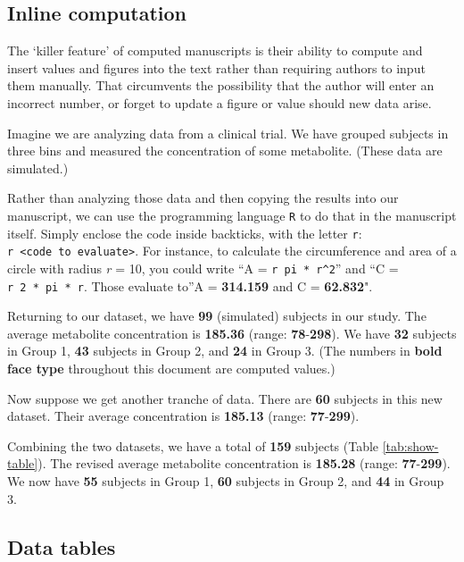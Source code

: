 \documentclass[smallextended]{svjour3}       %
\begin{document}
\hypertarget{sec:1}{%
\subsection{Inline computation}\label{sec:1}}

The `killer feature' of computed manuscripts is their ability to compute and insert values and figures into the text rather than requiring authors to input them manually. That circumvents the possibility that the author will enter an incorrect number, or forget to update a figure or value should new data arise.

Imagine we are analyzing data from a clinical trial. We have grouped subjects in three bins and measured the concentration of some metabolite. (These data are simulated.)

Rather than analyzing those data and then copying the results into our manuscript, we can use the programming language \texttt{R} to do that in the manuscript itself. Simply enclose the code inside backticks, with the letter \texttt{r}: \texttt{\textasciigrave{}r\ \textless{}code\ to\ evaluate\textgreater{}\textasciigrave{}}. For instance, to calculate the circumference and area of a circle with radius \emph{r} = 10, you could write ``A = \texttt{\textasciigrave{}r\ pi\ *\ r\^{}2\textasciigrave{}}'' and ``C = \texttt{\textasciigrave{}r\ 2\ *\ pi\ *\ r\textasciigrave{}}. Those evaluate to''A = \textbf{314.159} and C = \textbf{62.832}".

Returning to our dataset, we have \textbf{99} (simulated) subjects in our study. The average metabolite concentration is \textbf{185.36} (range: \textbf{78}-\textbf{298}). We have \textbf{32} subjects in Group 1, \textbf{43} subjects in Group 2, and \textbf{24} in Group 3. (The numbers in \textbf{bold face type} throughout this document are computed values.)

Now suppose we get another tranche of data. There are \textbf{60} subjects in this new dataset. Their average concentration is \textbf{185.13} (range: \textbf{77}-\textbf{299}).

Combining the two datasets, we have a total of \textbf{159} subjects (Table \ref{tab:show-table}). The revised average metabolite concentration is \textbf{185.28} (range: \textbf{77}-\textbf{299}). We now have \textbf{55} subjects in Group 1, \textbf{60} subjects in Group 2, and \textbf{44} in Group 3.

\hypertarget{sec:2}{%
\subsection{Data tables}\label{sec:2}}
\end{document}
